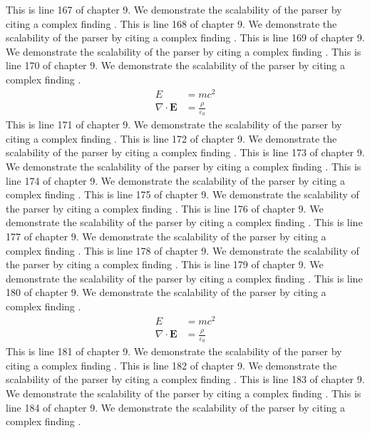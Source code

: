 This is line 167 of chapter 9. We demonstrate the scalability of the parser by citing a complex finding \cite{ref9_167}.
This is line 168 of chapter 9. We demonstrate the scalability of the parser by citing a complex finding \cite{ref9_168}.
This is line 169 of chapter 9. We demonstrate the scalability of the parser by citing a complex finding \cite{ref9_169}.
This is line 170 of chapter 9. We demonstrate the scalability of the parser by citing a complex finding \cite{ref9_170}.
\begin{align*}
  E &= mc^2 \\
  \nabla \cdot \mathbf{E} &= \frac{\rho}{\varepsilon_0}
\end{align*}
This is line 171 of chapter 9. We demonstrate the scalability of the parser by citing a complex finding \cite{ref9_171}.
This is line 172 of chapter 9. We demonstrate the scalability of the parser by citing a complex finding \cite{ref9_172}.
This is line 173 of chapter 9. We demonstrate the scalability of the parser by citing a complex finding \cite{ref9_173}.
This is line 174 of chapter 9. We demonstrate the scalability of the parser by citing a complex finding \cite{ref9_174}.
This is line 175 of chapter 9. We demonstrate the scalability of the parser by citing a complex finding \cite{ref9_175}.
This is line 176 of chapter 9. We demonstrate the scalability of the parser by citing a complex finding \cite{ref9_176}.
This is line 177 of chapter 9. We demonstrate the scalability of the parser by citing a complex finding \cite{ref9_177}.
This is line 178 of chapter 9. We demonstrate the scalability of the parser by citing a complex finding \cite{ref9_178}.
This is line 179 of chapter 9. We demonstrate the scalability of the parser by citing a complex finding \cite{ref9_179}.
This is line 180 of chapter 9. We demonstrate the scalability of the parser by citing a complex finding \cite{ref9_180}.
\begin{align*}
  E &= mc^2 \\
  \nabla \cdot \mathbf{E} &= \frac{\rho}{\varepsilon_0}
\end{align*}
This is line 181 of chapter 9. We demonstrate the scalability of the parser by citing a complex finding \cite{ref9_181}.
This is line 182 of chapter 9. We demonstrate the scalability of the parser by citing a complex finding \cite{ref9_182}.
This is line 183 of chapter 9. We demonstrate the scalability of the parser by citing a complex finding \cite{ref9_183}.
This is line 184 of chapter 9. We demonstrate the scalability of the parser by citing a complex finding \cite{ref9_184}.

